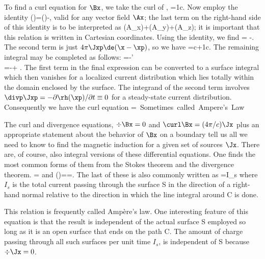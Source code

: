 {To find a curl equation for $\Bx$, we take the curl of ,
\beq
\curl\Bx=\frac1c\curl\leb\curl\lep\inivp\frac{\Jxp}{\xxpa}\rip\rib.
\eeq
Now employ the identity
\beq
\curl(\curl\A)=\grad(\div\A)-\lap\A,
\eeq
valid for any vector field $\Ax$; the last term on the right-hand side of this
identity is to be interpreted as
\beq
\lap\A\equiv(\lap A_x)\xh+(\lap A_y)\yh+(\lap A_z)\zh;
\eeq
it is important that this relation is written in Cartesian coordinates.
Using the identity, we find
\beq
\curl\leb\curl\lep\frac{\Jxp}{\xxpa}\rip\rib=\grad\leb\Jxp\cdot\grad
\lep\xxpi\rip\rib-\Jxp\lap\lep\xxpi\rip.
\eeq
The second term is just $4\pi\Jxp\de(\x-\xp)$, so we have
\beq
\curl\Bx=\frac{4\pi}c\Jx+\frac1c\grad\leb\inivp\Jxp\cdot\grad\lep\xxpi\rip\rib.
\eeq
The remaining integral may be completed as follows:
\beqa
\grad\inivp\Jxp\cdot\grad\lep\xxpi\rip=-\grad\inivp\Jxp\cdot\grad'\lep\xxpi\rip
\nonumber\\=-\grad\inivp\divp\lep\frac{\Jxp}{\xxpa}\rip+\grad\inivp\frac
{\divp\Jxp}{\xxpa}.
\eeqa
The first term in the final expression can be converted to a surface
integral which then vanishes for a localized current distribution which
lies totally within the domain enclosed by the surface. The integrand of
the second term involves $\divp\Jxp=-\partial\rh(\xp)/\partial t\equiv0$
for a steady-state current distribution. Consequently we have the curl
equation
\beq
\curl\Bx=\Jx \mbox{ Sometimes called Ampere's Law}
\eeq

The curl and divergence equations, $\div\Bx=0$ and $\curl\Bx=(4\pi/c)\Jx$
plus an appropriate statement about the behavior of $\Bx$ on a boundary
tell us all we need to know to find the magnetic induction for a given set
of sources $\Jx$. There are, of course, also integral versions of these
differential equations. One finds the most common forms of them from the
Stokes theorem and the divergence theorem.
\beq
\inv\div\Bx=\ina\Bx\cdot{}
\eeq
and
\beq
\ina(\curl\Bx)\cdot\nn=\invl\cdot\Bx=\ina\Jx\cdot\nn.
\eeq
The last of these is also commonly written as
\beq
\invl\cdot\Bx=I_s
\eeq
where $I_s$ is the total current passing through the surface S in the
direction of a right-hand normal relative to the direction in which the
line integral around C is done.

\centerline{}

\noindent This relation is frequently called
Amp\`ere's law. One interesting feature of this equation is that the result
is independent of the actual surface S employed so long as it is an open
surface that ends on the path C. The amount of charge passing through all
such surfaces per unit time \ie $I_s$, is independent of S because $\div\Jx
=0$.

}
